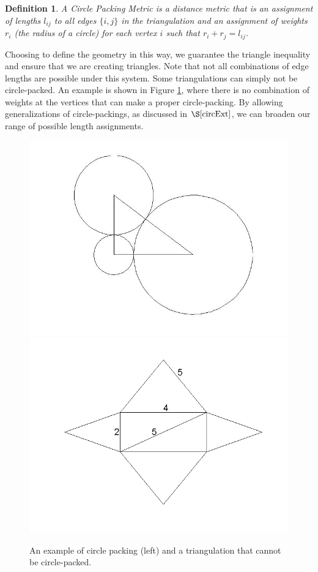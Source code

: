\documentclass[12pt]{article}
\newtheorem{definition}[theorem]{Definition}
\begin{document}
\begin{definition}
A Circle Packing Metric is a distance metric that is an assignment of lengths $l_{ij}$ to all edges $\{i, j\}$ in the triangulation and an assignment of weights $r_i$ (the radius of a circle) for each vertex $i$ such that $r_i + r_j = l_{ij}$. 
\end{definition}

\noindent Choosing to define the geometry in this way, we guarantee the triangle inequality and ensure that we are creating triangles. Note that not all combinations of edge lengths are possible under this system. Some triangulations can simply not be circle-packed. An example is shown in Figure \ref{rightTri}, where there is no combination of weights at the vertices that can make a proper circle-packing. By allowing generalizations of circle-packings, as discussed in $\S\ref{circExt}$, we can broaden our range of possible length assignments.

  
\begin{figure}
\includegraphics[scale = 0.3]{Pictures/righttriangulation.jpg}
\includegraphics[scale = 0.5]{Pictures/badcase2.png}
\caption{An example of circle packing (left) and a triangulation that cannot be circle-packed.}
\label{rightTri}
\end{figure}
\end{document}
